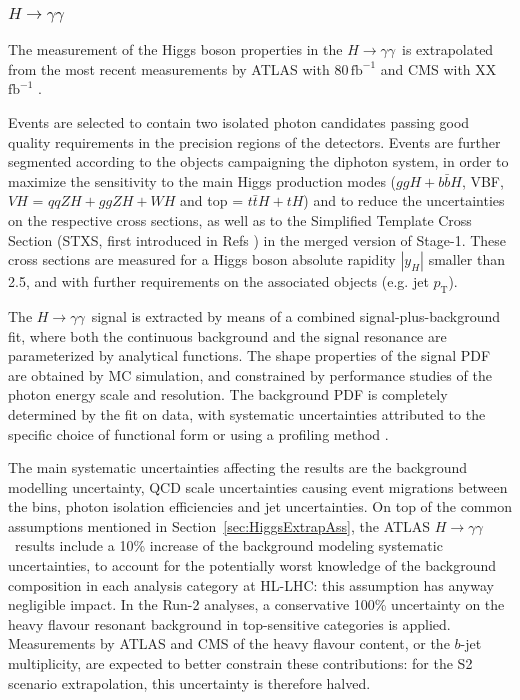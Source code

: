 \subsubsection{$H \to \gamma\gamma$}
\label{sec:Hgammagamma}

\newcommand{\Hyy}{\hbox{$H\to\gamma\gamma$}}

The measurement of the Higgs boson properties in the \Hyy\ is extrapolated from the most recent measurements by ATLAS with 80\,$\mathrm{fb}^{-1}$ \cite{ATLAS:2018uso} and CMS with XX\,$\mathrm{fb}^{-1}$ \cite{}.

Events are selected to contain two isolated photon candidates passing good quality requirements in the precision regions of the detectors. Events are further segmented according to the objects campaigning the diphoton system, in order to maximize the sensitivity to the main Higgs production modes ($ggH+b\bar{b}H$, VBF, $VH$ = $qqZH+ggZH+WH$ and top = $t\bar{t}H+tH$) and to reduce the uncertainties on the respective cross sections, as well as to the Simplified Template Cross Section (STXS, first introduced in Refs \cite{}) in the merged version of Stage-1. These cross sections are measured for a Higgs boson absolute rapidity $|y_H|$ smaller than 2.5, and with further requirements on the associated objects (e.g. jet $p_\mathrm{T}$).

The \Hyy\ signal is extracted by means of a combined signal-plus-background fit, where both the continuous background and the signal resonance are parameterized by analytical functions. The shape properties of the signal PDF are obtained by MC simulation, and constrained by performance studies of the photon energy scale and resolution. The background PDF is completely determined by the fit on data, with systematic uncertainties attributed to the specific choice of functional form \cite{} or using a profiling method \cite{}.

The main systematic uncertainties affecting the results are the background modelling uncertainty, QCD scale uncertainties causing event migrations between the bins, photon isolation efficiencies and jet uncertainties.
%
On top of the common assumptions mentioned in Section~\ref{sec:HiggsExtrapAss}, the ATLAS \Hyy\ results include a 10\% increase of the background modeling systematic uncertainties, to account for the potentially worst knowledge of the background composition in each analysis category at HL-LHC: this assumption has anyway negligible impact.
%
In the Run-2 analyses, a conservative 100\% uncertainty on the heavy flavour resonant background in top-sensitive categories is applied. Measurements by ATLAS and CMS of the heavy flavour content, or the $b$-jet multiplicity, are expected to better constrain these contributions: for the S2 scenario extrapolation, this uncertainty is therefore halved.

